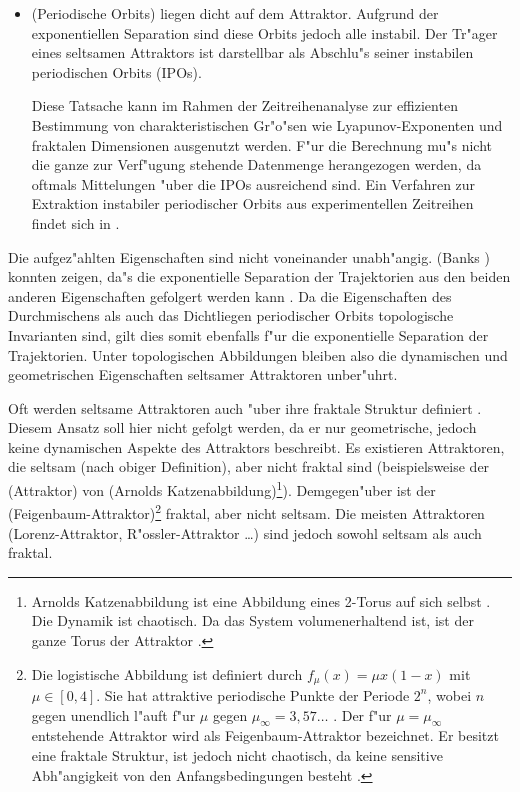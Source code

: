 \begin{itemize}
\item \begriff(Periodische Orbits) liegen dicht auf dem Attraktor. Aufgrund der
  exponentiellen Separation sind diese Orbits jedoch alle instabil. Der Tr"ager eines
  seltsamen Attraktors ist darstellbar als Abschlu"s seiner instabilen periodischen Orbits
  (IPOs).
  
  Diese Tatsache kann im Rahmen der Zeitreihenanalyse zur effizienten Bestimmung von
  charakteristischen Gr"o"sen wie Lyapunov-Exponenten und fraktalen Dimensionen ausgenutzt
  werden. F"ur die Berechnung mu"s nicht die ganze zur Verf"ugung stehende Datenmenge
  herangezogen werden, da oftmals Mittelungen "uber die IPOs ausreichend sind.  Ein
  Verfahren zur Extraktion instabiler periodischer Orbits aus experimentellen Zeitreihen
  findet sich in \cite{Pawelzik91,Pawelzik91a}.
\end{itemize}
Die aufgez"ahlten Eigenschaften sind nicht voneinander unabh"angig. \autor(Banks \etal)
konnten zeigen, da"s die exponentielle Separation der Trajektorien aus den beiden anderen
Eigenschaften gefolgert werden kann \cite{Banks92}. Da die Eigenschaften des Durchmischens
als auch das Dichtliegen periodischer Orbits topologische Invarianten sind, gilt
dies somit ebenfalls f"ur die exponentielle Separation der Trajektorien. Unter
topologischen Abbildungen bleiben also die dynamischen und geometrischen Eigenschaften
seltsamer Attraktoren unber"uhrt.

Oft werden seltsame Attraktoren auch "uber ihre fraktale Struktur definiert
\cite{Peitgen92}. Diesem Ansatz soll hier nicht gefolgt werden, da er nur geometrische,
jedoch keine dynamischen Aspekte des Attraktors beschreibt. Es existieren Attraktoren, die
seltsam (nach obiger Definition), aber nicht fraktal sind (beispielsweise der
\naja(Attraktor) von \begriff(Arnolds Katzenabbildung)\footnote{Arnolds Katzenabbildung
  ist eine Abbildung eines 2-Torus auf sich selbst \cite{Arnold68}. Die Dynamik ist
  chaotisch. Da das System volumenerhaltend ist, ist der ganze Torus der Attraktor
  \cite{Eckmann-ruelle}.  }). Demgegen"uber ist der
\begriff(Feigenbaum-Attraktor)\footnote{Die logistische Abbildung ist definiert durch
  $f_\mu(x)=\mu x(1-x)$ mit $\mu\in[0,4]$. Sie hat attraktive periodische Punkte der
  Periode $2^n$, wobei $n$ gegen unendlich l"auft f"ur $\mu$ gegen $\mu_\infty=3,57\dots$
  . Der f"ur $\mu=\mu_\infty$ entstehende Attraktor wird als Feigenbaum-Attraktor
  bezeichnet. Er besitzt eine fraktale Struktur, ist jedoch nicht chaotisch, da keine
  sensitive Abh"angigkeit von den Anfangsbedingungen besteht \cite{Eckmann-ruelle}.}
fraktal, aber nicht seltsam.  Die meisten Attraktoren (Lorenz-Attraktor,
R"ossler-Attraktor \dots) sind jedoch sowohl seltsam als auch fraktal.


